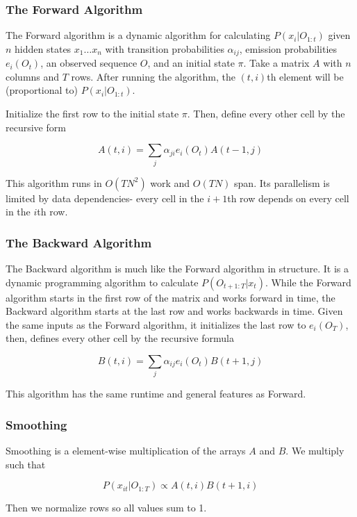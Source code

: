 \documentclass[12pt]{article}
\begin{document}
\subsubsection{The Forward Algorithm}

The Forward algorithm is a dynamic algorithm for calculating $P(x_i | O_{1:t})$ given $n$ hidden states $x_1 \ldots x_n$ with transition probabilities $\alpha_{ij}$, emission probabilities $e_i(O_t)$, an observed sequence $O$, and an initial state $\pi$.  Take a matrix $A$ with $n$ columns and $T$ rows.  After running the algorithm, the $(t,i)$th element will be (proportional to) $P(x_i | O_{1:t})$.  

Initialize the first row to the initial state $\pi$.  Then, define every other cell by the recursive form

$$ A(t, i) = \sum_j \alpha_{ji} e_i(O_t) A(t-1, j) $$

This algorithm runs in $O(TN^2)$ work and $O(TN)$ span.  Its parallelism is limited by data dependencies- every cell in the $i+1$th row depends on every cell in the $i$th row.

\subsubsection{The Backward Algorithm}

The Backward algorithm is much like the Forward algorithm in structure.  It is a dynamic programming algorithm to calculate $P(O_{t+1:T} | x_t)$.  While the Forward algorithm starts in the first row of the matrix and works forward in time, the Backward algorithm starts at the last row and works backwards in time.  Given the same inputs as the Forward algorithm, it initializes the last row to $e_i(O_T)$, then, defines every other cell by the recursive formula 

$$ B(t, i) = \sum_j \alpha_{ij} e_i(O_t) B(t+1, j) $$

This algorithm has the same runtime and general features as Forward.

\subsubsection{Smoothing}

Smoothing is a element-wise multiplication of the arrays $A$ and $B$.  We multiply such that 

$$ P(x_{it} | O_{1:T}) \propto A(t, i)B(t+1,i) $$

Then we normalize rows so all values sum to 1.  
\end{document}
